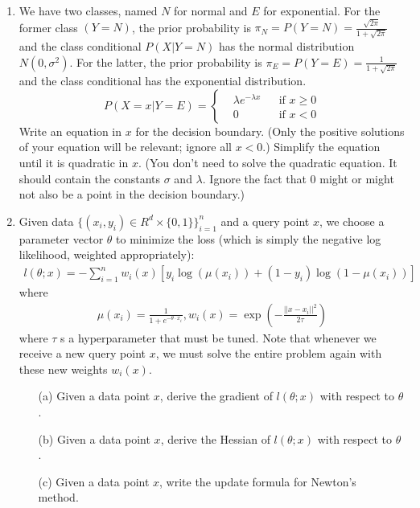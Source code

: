\documentclass[10pt]{article}
\begin{document}
\begin{enumerate}[1.]
		\item  We have two classes, named $N$ for normal and $E$ for exponential. For the former class $(Y=N)$, the prior probability is $\pi_N = P(Y=N) = \frac{\sqrt{2\pi}}{1+\sqrt{2\pi}}$ and the class conditional $P(X|Y=N)$ has the normal distribution $N(0,\sigma^2)$. For the latter, the prior probability is $\pi_E = P(Y=E) = \frac{1}{1+\sqrt{2\pi}}$ and the class conditional has the exponential distribution.
        $$ P(X=x|Y=E)=\left\{
\begin{aligned}
&\lambda e^{-\lambda x} & & \text{if } x\geq 0\\
&0 & & \text{if } x< 0
\end{aligned}
\right.
$$
Write an equation in $x$ for the decision boundary. (Only the positive solutions of your equation will be relevant;
ignore all $x < 0$.) Simplify the equation until it is quadratic in $x$. (You don’t need to solve
the quadratic equation. It should contain the constants $\sigma$ and $\lambda$. Ignore the fact that 0 might or might not also be
a point in the decision boundary.) ~



        \item  Given data $\{(x_i, y_i) \in R^d \times \{0, 1\}\}_{i=1}^n$ and a query point $x$, we choose a parameter vector $\theta$ to minimize the loss (which is simply the
negative log likelihood, weighted appropriately):
        \begin{align*}
            l(\theta;x) = -\sum_{i=1}^{n}w_i(x)[y_i\log(\mu(x_i))+(1-y_i)\log(1-\mu(x_i))]
        \end{align*}
        where
        \begin{align*}
            \mu(x_i) = \frac{1}{1+e^{-\theta\cdot x_i}}, w_i(x) = \exp(-\frac{||x-x_i||^2}{2\tau})
        \end{align*}
        where $\tau$ s a hyperparameter that must be tuned. Note that whenever we receive a new query point $x$, we must solve
the entire problem again with these new weights $w_i(x)$.

        \begin{itemize}
			\item[(a)] Given a data point $x$,  derive the gradient of $l(\theta; x)$ with respect to $\theta$.~
			
			\item[(b)] Given a data point $x$,  derive the Hessian of $l(\theta; x)$ with respect to $\theta$.~

            \item[(c)]  Given a data point $x$, write the update formula for Newton’s method.~
        \end{itemize}
        



\end{enumerate}
\end{document}
